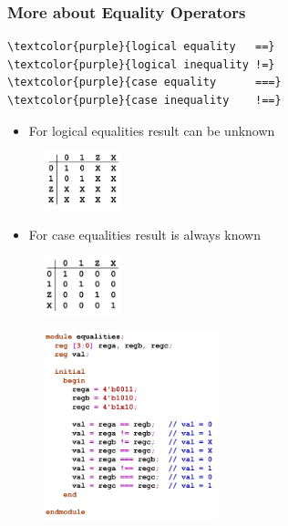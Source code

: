 \documentclass[t, notes, xcolor=table]{beamer}
\begin{document}
\begin{frame}[fragile]
\frametitle{More about Equality Operators}
\scriptsize{
\begin{multicols}{2}

\begin{Verbatim}[commandchars=\\\{\}, tabsize=2]
\textcolor{purple}{logical equality   ==}
\textcolor{purple}{logical inequality !=}
\textcolor{purple}{case equality      ===}
\textcolor{purple}{case inequality    !==}
\end{Verbatim}
\begin{itemize}
\item For logical equalities result can be unknown
\end{itemize}

\begin{figure}
    \includegraphics[width=0.2\textwidth]{img/05_equal0.png}
\end{figure}

\begin{itemize}
\item For case equalities result is always known
\end{itemize}
\begin{figure}
    \includegraphics[width=0.2\textwidth]{img/05_equal1.png}
\end{figure}
\vfill
\columnbreak
\begin{figure}
    \includegraphics[width=0.45\textwidth]{img/05_inequality.png}
\end{figure}

\end{multicols}
}
\end{frame}
\end{document}
